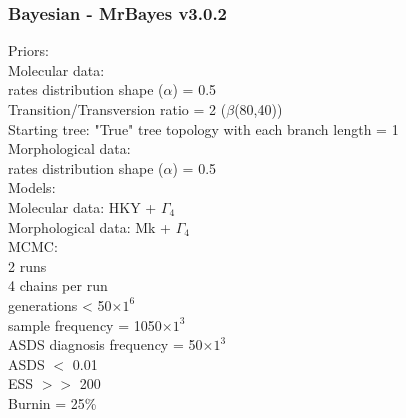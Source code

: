\subsubsection{Bayesian - MrBayes v3.0.2 \citep{Ronquist2012mrbayes}}

Priors: \\
Molecular data: \\
rates distribution shape ($\alpha$) = 0.5 \\
Transition/Transversion ratio = 2 ($\beta$(80,40)) \\
Starting tree: "True" tree topology with each branch length = 1 \\
Morphological data: \\
rates distribution shape ($\alpha$) = 0.5 \\
Models: \\
Molecular data: HKY + $\Gamma_4$ \\
Morphological data: Mk + $\Gamma_4$ \\
MCMC: \\
2 runs \\
4 chains per run \\
generations < 50$\times$$1^6$ \\
sample frequency = 1050$\times$$1^3$ \\
ASDS diagnosis frequency = 50$\times$$1^3$ \\
ASDS $<$ 0.01 \\
ESS $>>$ 200 \\
Burnin = 25\%